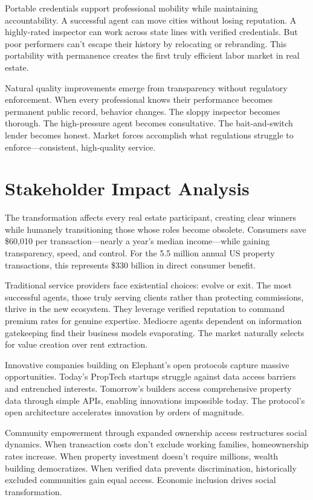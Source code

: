 Portable credentials support professional mobility while maintaining accountability. A successful agent can move cities without losing reputation. A highly-rated inspector can work across state lines with verified credentials. But poor performers can't escape their history by relocating or rebranding. This portability with permanence creates the first truly efficient labor market in real estate.

Natural quality improvements emerge from transparency without regulatory enforcement. When every professional knows their performance becomes permanent public record, behavior changes. The sloppy inspector becomes thorough. The high-pressure agent becomes consultative. The bait-and-switch lender becomes honest. Market forces accomplish what regulations struggle to enforce—consistent, high-quality service.

\section{Stakeholder Impact Analysis}

The transformation affects every real estate participant, creating clear winners while humanely transitioning those whose roles become obsolete. Consumers save \$60,010 per transaction—nearly a year's median income—while gaining transparency, speed, and control. For the 5.5 million annual US property transactions, this represents \$330 billion in direct consumer benefit.

Traditional service providers face existential choices: evolve or exit. The most successful agents, those truly serving clients rather than protecting commissions, thrive in the new ecosystem. They leverage verified reputation to command premium rates for genuine expertise. Mediocre agents dependent on information gatekeeping find their business models evaporating. The market naturally selects for value creation over rent extraction.

Innovative companies building on Elephant's open protocols capture massive opportunities. Today's PropTech startups struggle against data access barriers and entrenched interests. Tomorrow's builders access comprehensive property data through simple APIs, enabling innovations impossible today. The protocol's open architecture accelerates innovation by orders of magnitude.

Community empowerment through expanded ownership access restructures social dynamics. When transaction costs don't exclude working families, homeownership rates increase. When property investment doesn't require millions, wealth building democratizes. When verified data prevents discrimination, historically excluded communities gain equal access. Economic inclusion drives social transformation.

